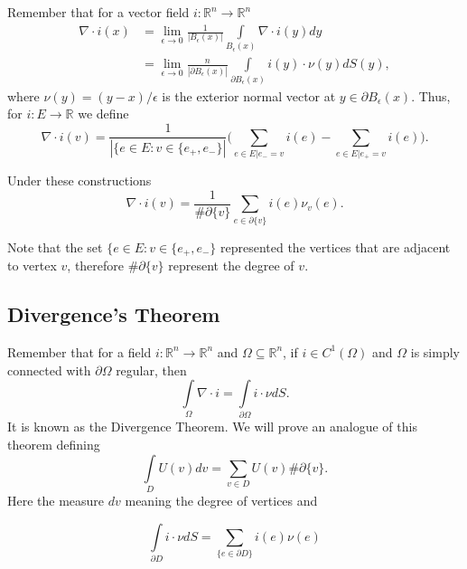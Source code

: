 \documentclass{article}
\begin{document}
 

\noindent Remember that for a vector field $i:\mathbb{R}^n\rightarrow \mathbb{R}^n$
\begin{align*}
\nabla\cdot i(x)&=\lim\limits_{\epsilon \rightarrow 0}\frac{1}{|B_{\epsilon}(x)|}\int \limits_{B_{\epsilon}(x)}\nabla\cdot i(y)dy\\
&=\lim\limits_{\epsilon \rightarrow 0}\frac{n}{|\partial B_{\epsilon}(x)|}\int \limits_{\partial B_{\epsilon}(x)}i(y)\cdot \nu(y)dS(y),
\end{align*}
where $\nu(y)=(y-x)/\epsilon$ is the exterior normal vector at $y\in \partial B_{\epsilon}(x)$. Thus, for $i\colon E\to \mathbb{R}$ we define
\[
\nabla\cdot i(v)=\frac{1}{|\{e\in E: v\in \{e_+,e_-\}|}\bigg(\sum \limits_{e\in E|e_-=v}i(e)-\sum \limits_{e\in E|e_+=v}i(e)\bigg).
\]



\noindent Under these constructions
\[
\nabla\cdot i(v)=\frac{1}{\# \partial\{v\}}\sum \limits_{e\in \partial \{v\}}i(e)\nu_v(e).
\]

\noindent Note that the set $\{e\in E: v\in \{e_+,e_-\}$ represented the vertices that are adjacent to vertex $v$, therefore $\# \partial\{v\}$ represent the degree of $v$.

\subsection{Divergence's Theorem}
 Remember that for a field $i: \mathbb{R}^n\rightarrow \mathbb{R}^n$ and $\Omega\subseteq \mathbb{R}^n$, if $i\in C^1(\Omega)$ and  $\Omega$ is simply connected with $\partial \Omega$ regular, then
\[
  \int \limits_{\Omega}\nabla\cdot i=\int \limits_{\partial \Omega}i\cdot \nu dS.
\]
It is known as the Divergence Theorem. We will prove an analogue of this theorem defining 
\[
\int\limits_{D}U(v)dv=\sum_{v\in D}U(v)\#\partial \{ v \}.
\]
Here the measure $dv $ meaning the degree of vertices and 

\[
\int \limits_{\partial D}i\cdot \nu dS=\sum_{ \{ e\in \partial D \} }i(e)\nu(e)
\]
\end{document}
